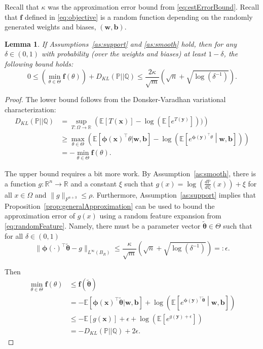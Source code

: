 \documentclass[twoside]{article}
\newtheorem{lemma}{Lemma}
\theoremstyle{definition}
\newcommand{\R}{\mathbb{R}}
\newcommand{\E}{\mathbb{E}}
\newcommand{\Prob}{\mathbb{P}}
\newcommand{\Q}{\mathbb{Q}}
\newcommand{\1}[1]{\scalebox{1.25}{$\mathds{1}$}\left[#1\right]}
\begin{document}
Recall that $\kappa$ was the approximation error bound from \eqref{eq:estErrorBound}. Recall that $\bm{f}$ defined in \eqref{eq:objective} is a random function depending on the randomly generated weights and biases, $(\bm{w},\bm{b})$.

\begin{lemma}
\label{lem:approx}
If Assumptions~\ref{as:support} and \ref{as:smooth} hold, then for any $\delta \in (0,1)$ with probability (over the weights and biases) at least $1-
\delta$, the following bound holds:
$$
0\le \left(\min_{\theta\in\Theta}\bm{f}(\theta)\right)+D_{KL}(\Prob||\Q)\le 
\frac{2\kappa}{\sqrt{m}}\left(\sqrt{n}+\sqrt{\log(\delta^{-1})}\right).
$$
\end{lemma}
\begin{proof}
The lower bound follows from the Donsker-Varadhan variational characterization:
\begin{align*}
D_{KL}(\Prob||\Q)&= \sup_{T: \Omega \to \R} \left(\E[T(\bm{x})] - \log(\E[e^{T(\bm{y})}]))\right)\\
&\ge \max_{\theta\in\Theta}\left(\E[\bm{\phi}(\bm{x})^\top \theta|\bm{w},\bm{b}]-\log\left(
\E\left[e^{\bm{\phi}(\bm{y})^\top \theta}\middle| \bm{w},\bm{b}\right]
\right)
\right)\\
&=-\min_{\theta\in\Theta}\bm{f}(\theta).
\end{align*}

The upper bound requires a bit more work. By Assumption~\ref{as:smooth}, there is a function $g:\R^n\to \R$ and a constant $\xi$ such that $g(x)=\log\left(\frac{d\Prob}{d\Q}(x)\right)+\xi$ for all $x\in\Omega$ and $\|g\|_{F^{n+3}}\le \rho$. Furthermore, Assumption~\ref{as:support} implies that Proposition~\ref{prop:generalApproximation} can be used to bound the approximation error of $g(x)$ using a random feature expansion from \eqref{eq:randomFeature}. Namely, there must be a parameter vector $\tilde{\bm{\theta}}\in \Theta$ such that for all $\delta \in (0,1) $
$$
\|\bm{\phi}(\cdot)^\top\tilde{\bm{\theta}}-g \|_{L^{\infty}(B_R)}\le \frac{\kappa}{\sqrt{m}}\left(\sqrt{n}+\sqrt{\log(\delta^{-1})}\right)=:\epsilon.
$$

Then
\begin{align*}
\min_{\theta\in\Theta}\bm{f}(\theta)&\le \bm{f}(\tilde{\bm{\theta}}) \\
&=-\E[\bm{\phi}(\bm{x})^\top \tilde{\bm{\theta}}|\bm{w},\bm{b}]+\log\left(
\E\left[e^{\bm{\phi}(\bm{y})^\top \tilde{\bm{\theta}}}\middle| \bm{w},\bm{b}\right]\right) \\
&\le -\E[g(\bm{x})]+\epsilon+\log\left(\E\left[e^{g(\bm{y})+\epsilon}\right]\right) \\
&=-
D_{KL}(\Prob||\Q)+2\epsilon. 
\end{align*}
\end{proof}
\end{document}
